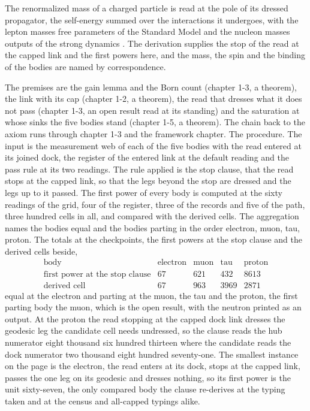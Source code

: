 \begin{chbridge}
The renormalized mass of a charged particle is read at the pole of its dressed propagator, the self-energy summed over the interactions it undergoes, with the lepton masses free parameters of the Standard Model and the nucleon masses outputs of the strong dynamics \cite{Dyson1949,Weinberg1967}. The derivation supplies the stop of the read at the capped link and the first powers here, and the mass, the spin and the binding of the bodies are named by correspondence.
\end{chbridge}
\begin{chproof}[finite]
The premises are the gain lemma and the Born count (chapter 1-3, a theorem), the link with its cap (chapter 1-2, a theorem), the read that dresses what it does not pass (chapter 1-3, an open result read at its standing) and the saturation at whose sinks the five bodies stand (chapter 1-5, a theorem). The chain back to the axiom runs through chapter 1-3 and the framework chapter. The procedure. The input is the measurement web of each of the five bodies with the read entered at its joined dock, the register of the entered link at the default reading and the pass rule at its two readings. The rule applied is the stop clause, that the read stops at the capped link, so that the legs beyond the stop are dressed and the legs up to it passed. The first power of every body is computed at the sixty readings of the grid, four of the register, three of the records and five of the path, three hundred cells in all, and compared with the derived cells. The aggregation names the bodies equal and the bodies parting in the order electron, muon, tau, proton. The totals at the checkpoints, the first powers at the stop clause and the derived cells beside,
\begin{equation}
\begin{array}{lrrrr}
\text{body} & \text{electron} & \text{muon} & \text{tau} & \text{proton}\\
\text{first power at the stop clause} & 67 & 621 & 432 & 8613\\
\text{derived cell} & 67 & 963 & 3969 & 2871
\end{array}
\end{equation}
equal at the electron and parting at the muon, the tau and the proton, the first parting body the muon, which is the open result, with the neutron printed as an output. At the proton the read stopping at the capped dock link dresses the geodesic leg the candidate cell needs undressed, so the clause reads the hub numerator eight thousand six hundred thirteen where the candidate reads the dock numerator two thousand eight hundred seventy-one. The smallest instance on the page is the electron, the read enters at its dock, stops at the capped link, passes the one leg on its geodesic and dresses nothing, so its first power is the unit sixty-seven, the only compared body the clause re-derives at the typing taken and at the census and all-capped typings alike.


\end{chproof}
